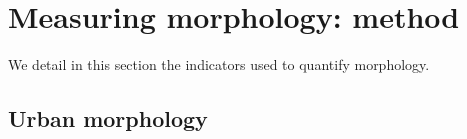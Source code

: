 \documentclass[11pt]{article}
\begin{document}



\section{Measuring morphology: method}

We detail in this section the indicators used to quantify morphology.

\subsection{Urban morphology}






\end{document}
